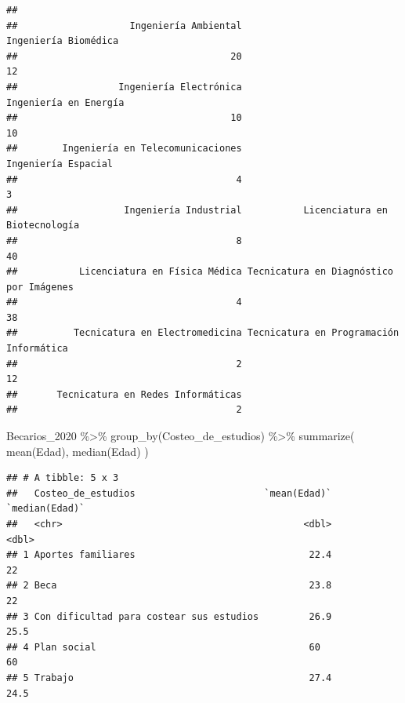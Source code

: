 \documentclass[
]{article}
\newenvironment{Shaded}{\begin{snugshade}}{\end{snugshade}}
\newcommand{\FunctionTok}[1]{\textcolor[rgb]{0.00,0.00,0.00}{#1}}
\newcommand{\NormalTok}[1]{#1}
\newcommand{\OtherTok}[1]{\textcolor[rgb]{0.56,0.35,0.01}{#1}}
\newcommand{\SpecialCharTok}[1]{\textcolor[rgb]{0.00,0.00,0.00}{#1}}
\begin{document}
\begin{verbatim}
## 
##                    Ingeniería Ambiental                    Ingeniería Biomédica 
##                                      20                                      12 
##                  Ingeniería Electrónica                   Ingeniería en Energía 
##                                      10                                      10 
##        Ingeniería en Telecomunicaciones                     Ingeniería Espacial 
##                                       4                                       3 
##                   Ingeniería Industrial           Licenciatura en Biotecnología 
##                                       8                                      40 
##           Licenciatura en Física Médica Tecnicatura en Diagnóstico por Imágenes 
##                                       4                                      38 
##          Tecnicatura en Electromedicina Tecnicatura en Programación Informática 
##                                       2                                      12 
##       Tecnicatura en Redes Informáticas 
##                                       2
\end{verbatim}

\begin{Shaded}
\begin{Highlighting}[]
\NormalTok{Becarios\_2020 }\SpecialCharTok{\%\textgreater{}\%} 
   \FunctionTok{group\_by}\NormalTok{(Costeo\_de\_estudios) }\SpecialCharTok{\%\textgreater{}\%} 
   \FunctionTok{summarize}\NormalTok{(}
     \FunctionTok{mean}\NormalTok{(Edad),}
     \FunctionTok{median}\NormalTok{(Edad)}
\NormalTok{   )}
\end{Highlighting}
\end{Shaded}

\begin{verbatim}
## # A tibble: 5 x 3
##   Costeo_de_estudios                       `mean(Edad)` `median(Edad)`
##   <chr>                                           <dbl>          <dbl>
## 1 Aportes familiares                               22.4           22  
## 2 Beca                                             23.8           22  
## 3 Con dificultad para costear sus estudios         26.9           25.5
## 4 Plan social                                      60             60  
## 5 Trabajo                                          27.4           24.5
\end{verbatim}

\begin{Shaded}
\end{Shaded}
\end{document}
